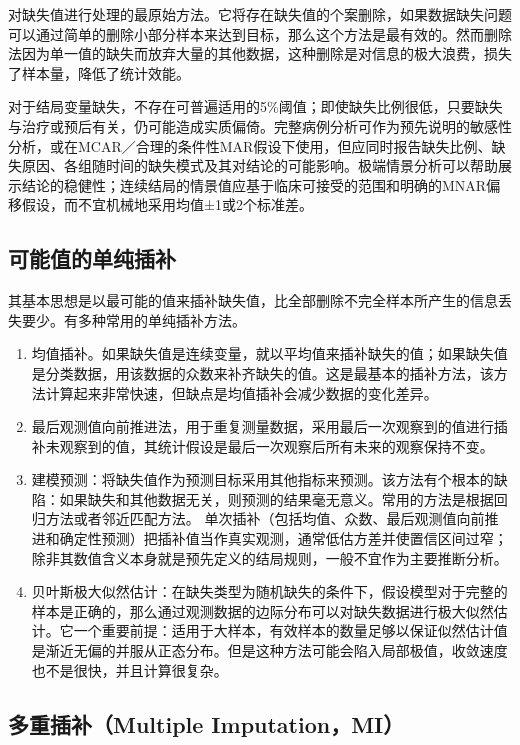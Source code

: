 \documentclass[
  chinese-hans,
  letterpaper,
  DIV=11,
  numbers=noendperiod]{scrreprt}
\begin{document}
对缺失值进行处理的最原始方法。它将存在缺失值的个案删除，如果数据缺失问题可以通过简单的删除小部分样本来达到目标，那么这个方法是最有效的。然而删除法因为单一值的缺失而放弃大量的其他数据，这种删除是对信息的极大浪费，损失了样本量，降低了统计效能。

对于结局变量缺失，不存在可普遍适用的5\%阈值；即使缺失比例很低，只要缺失与治疗或预后有关，仍可能造成实质偏倚。完整病例分析可作为预先说明的敏感性分析，或在MCAR／合理的条件性MAR假设下使用，但应同时报告缺失比例、缺失原因、各组随时间的缺失模式及其对结论的可能影响。极端情景分析可以帮助展示结论的稳健性；连续结局的情景值应基于临床可接受的范围和明确的MNAR偏移假设，而不宜机械地采用均值±1或2个标准差。

\subsection{可能值的单纯插补}\label{ux53efux80fdux503cux7684ux5355ux7eafux63d2ux8865}

其基本思想是以最可能的值来插补缺失值，比全部删除不完全样本所产生的信息丢失要少。有多种常用的单纯插补方法。

\begin{enumerate}
\def\labelenumi{\arabic{enumi}.}
\item
  均值插补。如果缺失值是连续变量，就以平均值来插补缺失的值；如果缺失值是分类数据，用该数据的众数来补齐缺失的值。这是最基本的插补方法，该方法计算起来非常快速，但缺点是均值插补会减少数据的变化差异。
\item
  最后观测值向前推进法，用于重复测量数据，采用最后一次观察到的值进行插补未观察到的值，其统计假设是最后一次观察后所有未来的观察保持不变。
\item
  建模预测：将缺失值作为预测目标采用其他指标来预测。该方法有个根本的缺陷：如果缺失和其他数据无关，则预测的结果毫无意义。常用的方法是根据回归方法或者邻近匹配方法。
  单次插补（包括均值、众数、最后观测值向前推进和确定性预测）把插补值当作真实观测，通常低估方差并使置信区间过窄；除非其数值含义本身就是预先定义的结局规则，一般不宜作为主要推断分析。
\item
  贝叶斯极大似然估计：在缺失类型为随机缺失的条件下，假设模型对于完整的样本是正确的，那么通过观测数据的边际分布可以对缺失数据进行极大似然估计。它一个重要前提：适用于大样本，有效样本的数量足够以保证似然估计值是渐近无偏的并服从正态分布。但是这种方法可能会陷入局部极值，收敛速度也不是很快，并且计算很复杂。
\end{enumerate}

\subsection{多重插补（Multiple
Imputation，MI）}\label{ux591aux91cdux63d2ux8865multiple-imputationmi}
\end{document}

